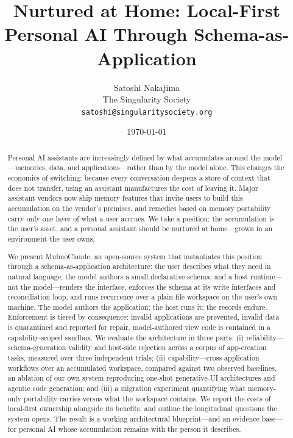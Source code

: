 \documentclass[11pt]{article}
\title{\textbf{Nurtured at Home: Local-First Personal AI Through Schema-as-Application}}
\author{
  Satoshi Nakajima\\
  \small The Singularity Society\\
  \small \texttt{satoshi@singularitysociety.org}
}
\date{\today}
\begin{document}
\maketitle
\let\thefootnote\relax{}

\begin{abstract}
Personal AI assistants are increasingly defined by what accumulates around the
model---memories, data, and applications---rather than by the model alone. This
changes the economics of switching: because every conversation deepens a store of
context that does not transfer, using an assistant manufactures the cost of
leaving it. Major assistant vendors now ship memory features that invite users to
build this accumulation on the vendor's premises, and remedies based on memory
portability carry only one layer of what a user accrues. We take a position: the
accumulation is the user's asset, and a personal assistant should be nurtured at
home---grown in an environment the user owns.

We present MulmoClaude, an open-source system that instantiates this position
through a schema-as-application architecture: the user describes what they need in
natural language; the model authors a small declarative schema; and a host
runtime---not the model---renders the interface, enforces the schema at its write
interfaces and reconciliation loop, and runs recurrence over a plain-file
workspace on the user's own machine. The model authors the application; the host
runs it; the records endure. Enforcement is tiered by consequence: invalid
applications are prevented, invalid data is quarantined and reported for repair,
model-authored view code is contained in a capability-scoped sandbox. We evaluate
the architecture in three parts: (i) reliability---schema-generation validity and
host-side rejection across a corpus of app-creation tasks, measured over three
independent trials; (ii) capability---cross-application workflows over an
accumulated workspace, compared against two observed baselines, an ablation of
our own system reproducing one-shot generative-UI architectures and agentic code
generation; and (iii) a migration experiment quantifying what memory-only
portability carries versus what the workspace contains. We report the costs of
local-first ownership alongside its benefits, and outline the longitudinal
questions the system opens. The result is a working architectural blueprint---and
an evidence base---for personal AI whose accumulation remains with the person it
describes.
\end{abstract}
\end{document}
